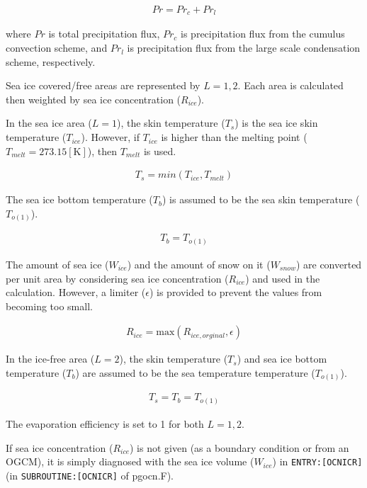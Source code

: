\begin{eqnarray}
    Pr = Pr_c + Pr_l
\end{eqnarray}

where \(Pr\) is total precipitation flux, \(Pr_c\) is precipitation flux
from the cumulus convection scheme, and \(Pr_l\) is precipitation flux
from the large scale condensation scheme, respectively.

Sea ice covered/free areas are represented by \(L=1,2\). Each area is
calculated then weighted by sea ice concentration (\(R_{ice}\)).

In the sea ice area (\(L=1\)), the skin temperature (\(T_s\)) is the sea
ice skin temperature (\(T_{ice}\)). However, if \(T_{ice}\) is higher
than the melting point (\(T_{melt}=273.15 \mathrm{[K]}\)), then
\(T_{melt}\) is used.

\begin{eqnarray}
    T_s = min(T_{ice},T_{melt})
\end{eqnarray}

The sea ice bottom temperature (\(T_b\)) is assumed to be the sea skin
temperature (\(T_{o(1)}\)).

\begin{eqnarray}
    T_b = T_{o(1)}
\end{eqnarray}

The amount of sea ice (\(W_{ice}\)) and the amount of snow on it
(\(W_{snow}\)) are converted per unit area by considering sea ice
concentration (\(R_{ice}\)) and used in the calculation. However, a
limiter (\(\epsilon\)) is provided to prevent the values from becoming
too small.

\begin{eqnarray}
R_{ice} =\mathrm{max}( R_{ice,orginal}, \epsilon)
\end{eqnarray}

In the ice-free area (\(L=2\)), the skin temperature (\(T_s\)) and sea
ice bottom temperature (\(T_b\)) are assumed to be the sea temperature
temperature (\(T_{o(1)}\)).

\begin{eqnarray}
    T_s = T_b = T_{o(1)}
\end{eqnarray}

The evaporation efficiency is set to 1 for both \(L=1, 2\).

If sea ice concentration (\(R_{ice}\)) is not given (as a boundary
condition or from an OGCM), it is simply diagnosed with the sea ice
volume (\(W_{ice}\)) in \texttt{ENTRY:{[}OCNICR{]}} (in
\texttt{SUBROUTINE:{[}OCNICR{]}} of pgocn.F).

